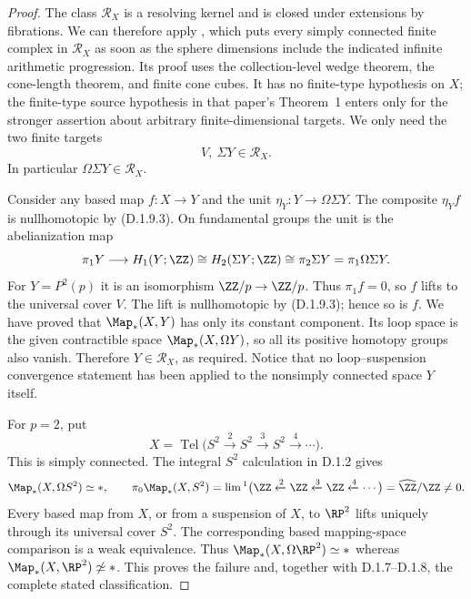 \begin{proof}
The class $\mathcal R_X$ is a resolving kernel and is closed
under extensions by fibrations. We can therefore apply
\cite[Corollary~12(a), pp.~8--9]{I_Strom2012}, which puts every
simply connected finite complex in $\mathcal R_X$ as soon as
the sphere dimensions include the indicated infinite arithmetic
progression. Its proof uses the collection-level wedge theorem,
the cone-length theorem, and finite cone cubes. It has no
finite-type hypothesis on $X$; the finite-type source hypothesis
in that paper's Theorem~1 enters only for the stronger assertion
about arbitrary finite-dimensional targets. We only need the
two finite targets
\[
                           V,\ \Sigma Y\in\mathcal R_X.
 \tag{D.1.9.3}
\]
In particular $\Omega\Sigma Y\in\mathcal R_X$.

Consider any based map $f:X\to Y$ and the unit
$\eta_Y:Y\to\Omega\Sigma Y$. The composite $\eta_Yf$ is
nullhomotopic by (D.1.9.3). On fundamental groups the unit is
the abelianization map
\[
 \pi_1Y\longrightarrow H_1(Y;\ZZ)
     \cong H_2(\Sigma Y;\ZZ)
     \cong\pi_2\Sigma Y=\pi_1\Omega\Sigma Y.
\]
For $Y=P^2(p)$ it is an isomorphism $\ZZ/p\to\ZZ/p$.
Thus $\pi_1f=0$, so $f$ lifts to the universal cover $V$.
The lift is nullhomotopic by (D.1.9.3); hence so is $f$.
We have proved that $\Map_*(X,Y)$ has only its constant
component. Its loop space is the given contractible space
$\Map_*(X,\Omega Y)$, so all its positive homotopy groups
also vanish. Therefore $Y\in\mathcal R_X$, as required.
Notice that no loop--suspension convergence statement has been
applied to the nonsimply connected space $Y$ itself.

For $p=2$, put
\[
 X=\operatorname{Tel}\bigl(S^2\xrightarrow{2}S^2
              \xrightarrow{3}S^2\xrightarrow{4}\cdots\bigr).
\]
This is simply connected. The integral $S^2$ calculation in
D.1.2 gives
\[
 \Map_*(X,\Omega S^2)\simeq *,\qquad
 \pi_0\Map_*(X,S^2)
       =\lim{}^1\bigl(\ZZ\xleftarrow{2}\ZZ
                      \xleftarrow{3}\ZZ\xleftarrow{4}\cdots\bigr)
       =\widehat\ZZ/\ZZ\ne0.
\]
Every based map from $X$, or from a suspension of $X$, to
$\RP^2$ lifts uniquely through its universal cover $S^2$.
The corresponding based mapping-space comparison is a weak
equivalence. Thus
$\Map_*(X,\Omega\RP^2)\simeq *$ whereas
$\Map_*(X,\RP^2)\not\simeq *$. This proves the failure and,
together with D.1.7--D.1.8, the complete stated classification.
\end{proof}
